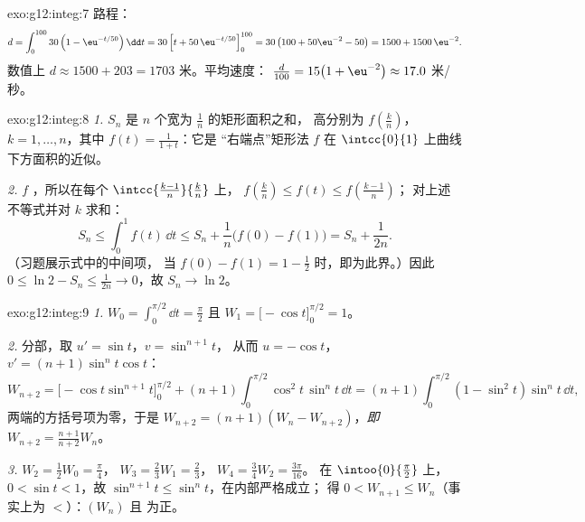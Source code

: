 \begin{solution}{exo:g12:integ:7}
路程：
\[
d = \int_0^{100} 30\left(1 - \eu^{-t/50}\right)\dd t
= 30\left[t + 50\,\eu^{-t/50}\right]_0^{100}
= 30\left(100 + 50\eu^{-2} - 50\right)
= 1500 + 1500\,\eu^{-2}.
\]
数值上 $d \approx 1500 + 203 = 1703$ 米。平均速度：
$\frac{d}{100} = 15\bigl(1 + \eu^{-2}\bigr) \approx 17.0$ 米/秒。
\end{solution}

\begin{solution}{exo:g12:integ:8}
\emph{1.} $S_n$ 是 $n$ 个宽为 $\frac1n$ 的矩形面积之和，
高分别为 $f\left(\frac kn\right)$，$k = 1, \dots, n$，其中
$f(t) = \frac{1}{1+t}$：它是 “右端点”矩形法
$f$ 在 $\intcc{0}{1}$ 上曲线下方面积的近似。

\emph{2.} $f$ ，所以在每个
$\intcc{\frac{k-1}{n}}{\frac kn}$ 上，
$f\left(\frac kn\right) \leq f(t) \leq f\left(\frac{k-1}{n}\right)$；
对上述不等式并对 $k$ 求和：
\[
S_n \leq \int_0^1 f(t)\,\dd t \leq S_n + \frac1n\bigl(f(0) - f(1)\bigr)
= S_n + \frac{1}{2n}.
\]
（习题展示式中的中间项，
当 $f(0) - f(1) = 1 - \frac12$ 时，即为此界。）因此
$0 \leq \ln 2 - S_n \leq \frac{1}{2n} \to 0$，故 $S_n \to \ln 2$。
\end{solution}

\begin{solution}{exo:g12:integ:9}
\emph{1.} $W_0 = \int_0^{\pi/2} \dd t = \frac{\pi}{2}$ 且
$W_1 = \bigl[-\cos t\bigr]_0^{\pi/2} = 1$。

\emph{2.} 分部，取 $u' = \sin t$，$v = \sin^{n+1} t$，
从而 $u = -\cos t$，$v' = (n+1)\sin^n t \cos t$：
\[
W_{n+2} = \bigl[-\cos t \sin^{n+1} t\bigr]_0^{\pi/2}
+ (n+1)\int_0^{\pi/2} \cos^2 t\,\sin^n t\,\dd t
= (n+1)\int_0^{\pi/2} (1 - \sin^2 t)\sin^n t\,\dd t,
\]
两端的方括号项为零，于是
$W_{n+2} = (n+1)(W_n - W_{n+2})$，\emph{即}
$W_{n+2} = \frac{n+1}{n+2} W_n$。

\emph{3.} $W_2 = \frac12 W_0 = \frac{\pi}{4}$，
$W_3 = \frac23 W_1 = \frac23$，
$W_4 = \frac34 W_2 = \frac{3\pi}{16}$。
在 $\intoo{0}{\frac\pi2}$ 上，$0 < \sin t < 1$，故
$\sin^{n+1} t \leq \sin^n t$，在内部严格成立；
得 $0 < W_{n+1} \leq W_n$（事实上为 $<$）：$(W_n)$ 且
为正。
\end{solution}

